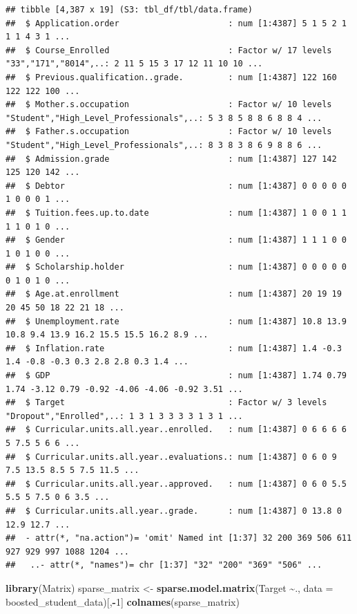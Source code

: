 \documentclass[
]{article}
\newenvironment{Shaded}{\begin{snugshade}}{\end{snugshade}}
\newcommand{\AttributeTok}[1]{\textcolor[rgb]{0.13,0.29,0.53}{#1}}
\newcommand{\DecValTok}[1]{\textcolor[rgb]{0.00,0.00,0.81}{#1}}
\newcommand{\FunctionTok}[1]{\textcolor[rgb]{0.13,0.29,0.53}{\textbf{#1}}}
\newcommand{\NormalTok}[1]{#1}
\newcommand{\OtherTok}[1]{\textcolor[rgb]{0.56,0.35,0.01}{#1}}
\newcommand{\SpecialCharTok}[1]{\textcolor[rgb]{0.81,0.36,0.00}{\textbf{#1}}}
\begin{document}
\begin{verbatim}
## tibble [4,387 x 19] (S3: tbl_df/tbl/data.frame)
##  $ Application.order                      : num [1:4387] 5 1 5 2 1 1 1 4 3 1 ...
##  $ Course_Enrolled                        : Factor w/ 17 levels "33","171","8014",..: 2 11 5 15 3 17 12 11 10 10 ...
##  $ Previous.qualification..grade.         : num [1:4387] 122 160 122 122 100 ...
##  $ Mother.s.occupation                    : Factor w/ 10 levels "Student","High_Level_Professionals",..: 5 3 8 5 8 8 6 8 8 4 ...
##  $ Father.s.occupation                    : Factor w/ 10 levels "Student","High_Level_Professionals",..: 8 3 8 3 8 6 9 8 8 6 ...
##  $ Admission.grade                        : num [1:4387] 127 142 125 120 142 ...
##  $ Debtor                                 : num [1:4387] 0 0 0 0 0 1 0 0 0 1 ...
##  $ Tuition.fees.up.to.date                : num [1:4387] 1 0 0 1 1 1 1 0 1 0 ...
##  $ Gender                                 : num [1:4387] 1 1 1 0 0 1 0 1 0 0 ...
##  $ Scholarship.holder                     : num [1:4387] 0 0 0 0 0 0 1 0 1 0 ...
##  $ Age.at.enrollment                      : num [1:4387] 20 19 19 20 45 50 18 22 21 18 ...
##  $ Unemployment.rate                      : num [1:4387] 10.8 13.9 10.8 9.4 13.9 16.2 15.5 15.5 16.2 8.9 ...
##  $ Inflation.rate                         : num [1:4387] 1.4 -0.3 1.4 -0.8 -0.3 0.3 2.8 2.8 0.3 1.4 ...
##  $ GDP                                    : num [1:4387] 1.74 0.79 1.74 -3.12 0.79 -0.92 -4.06 -4.06 -0.92 3.51 ...
##  $ Target                                 : Factor w/ 3 levels "Dropout","Enrolled",..: 1 3 1 3 3 3 3 1 3 1 ...
##  $ Curricular.units.all.year..enrolled.   : num [1:4387] 0 6 6 6 6 5 7.5 5 6 6 ...
##  $ Curricular.units.all.year..evaluations.: num [1:4387] 0 6 0 9 7.5 13.5 8.5 5 7.5 11.5 ...
##  $ Curricular.units.all.year..approved.   : num [1:4387] 0 6 0 5.5 5.5 5 7.5 0 6 3.5 ...
##  $ Curricular.units.all.year..grade.      : num [1:4387] 0 13.8 0 12.9 12.7 ...
##  - attr(*, "na.action")= 'omit' Named int [1:37] 32 200 369 506 611 927 929 997 1088 1204 ...
##   ..- attr(*, "names")= chr [1:37] "32" "200" "369" "506" ...
\end{verbatim}

\begin{Shaded}
\begin{Highlighting}[]
\FunctionTok{library}\NormalTok{(Matrix)}
\NormalTok{sparse\_matrix }\OtherTok{\textless{}{-}} \FunctionTok{sparse.model.matrix}\NormalTok{(Target }\SpecialCharTok{\textasciitilde{}}\NormalTok{., }\AttributeTok{data =}\NormalTok{ boosted\_student\_data)[,}\SpecialCharTok{{-}}\DecValTok{1}\NormalTok{]}
\FunctionTok{colnames}\NormalTok{(sparse\_matrix)}
\end{Highlighting}
\end{Shaded}
\end{document}
